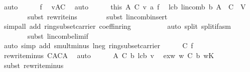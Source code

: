 \begin{isabellebody}
\ auto\isanewline
\ \ \ \ \isamarkupfalse%
\ f\ \isamarkupfalse%
\ {\isachardoublequoteopen}v{\isasymnotin}{\isacharquery}A{\isacharprime}{\isasymunion}C{\isacharprime}{\isachardoublequoteclose}\ \isamarkupfalse%
\ auto\isanewline
\ \ \ \ \isamarkupfalse%
\ this\ A\ C{\isacharprime}\ v\ a\ f\ \isamarkupfalse%
\ lcb{\isacharcolon}\ {\isachardoublequoteopen}lincomb\ {\isacharquery}b\ {\isacharparenleft}A\ {\isasymunion}\ C{\isacharprime}{\isacharparenright}\ {\isacharequal}\ {\isasymzero}\isactrlbsub V\isactrlesub {\isachardoublequoteclose}\isanewline
\ \ \ \ \ \ \isamarkupfalse%
\ {\isacharparenleft}subst\ rewrite{\isacharunderscore}ins{\isacharparenright}\isanewline
\ \ \ \ \ \ \isamarkupfalse%
\ {\isacharparenleft}subst\ lincomb{\isacharunderscore}insert{\isacharparenright}\isanewline
\ \ \ \ \ \ \ \ \ \ \ \isamarkupfalse%
\ {\isacharparenleft}simp{\isacharunderscore}all\ add{\isacharcolon}\ ring{\isacharunderscore}subset{\isacharunderscore}carrier\ coeff{\isacharunderscore}in{\isacharunderscore}ring{\isacharparenright}\isanewline
\ \ \ \ \ \ \ \ \isamarkupfalse%
\ {\isacharparenleft}auto\ split{\isacharcolon}\ split{\isacharunderscore}if{\isacharunderscore}asm{\isacharparenright}\isanewline
\ \ \ \ \ \ \isamarkupfalse%
\ {\isacharparenleft}subst\ lincomb{\isacharunderscore}elim{\isacharunderscore}if{\isacharparenright}\isanewline
\ \ \ \ \ \ \ \ \ \ \isamarkupfalse%
\ {\isacharparenleft}auto\ simp\ add{\isacharcolon}\ smult{\isacharunderscore}minus{\isacharunderscore}{}\ l{\isacharunderscore}neg\ ring{\isacharunderscore}subset{\isacharunderscore}carrier{\isacharparenright}\isanewline
\isanewline
\ \ \ \ \isamarkupfalse%
\ C{\isacharprime}\ f\ \isamarkupfalse%
\ rewrite{\isacharunderscore}minus{\isacharcolon}\ {\isachardoublequoteopen}C{\isacharprime}{\isacharequal}{\isacharparenleft}A{\isasymunion}C{\isacharprime}{\isacharparenright}{\isacharminus}A{\isachardoublequoteclose}\ \isamarkupfalse%
\ auto\isanewline
\ \ \ \ \isamarkupfalse%
\ A\ C{\isacharprime}\ b\ lcb\ v\ \isamarkupfalse%
\ exw{\isacharcolon}\ {\isachardoublequoteopen}{\isasymexists}w{\isasymin}\ C{\isacharprime}{\isachardot}\ {\isacharquery}b\ w{\isasymnoteq}{\isasymzero}\isactrlbsub K\isactrlesub {\isachardoublequoteclose}\ \isanewline
\ \ \ \ \ \ \isamarkupfalse%
\ {\isacharparenleft}subst\ rewrite{\isacharunderscore}minus{\isacharparenright}\isanewline

\end{isabellebody}
